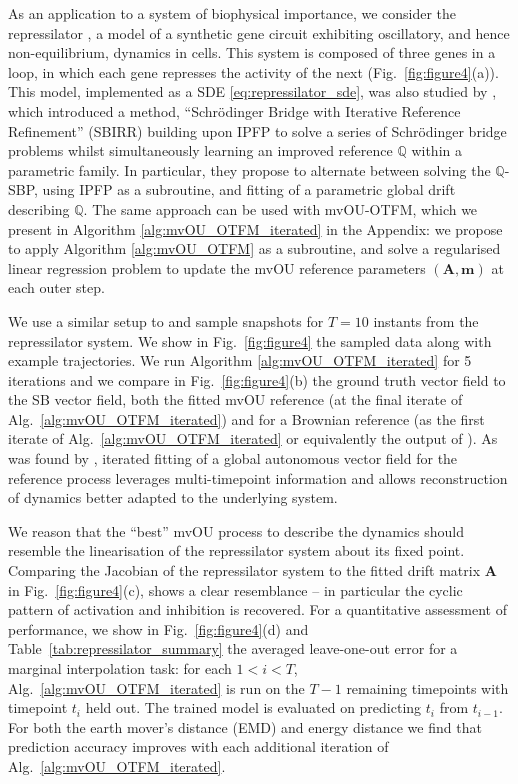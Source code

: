 \documentclass{article}
\theoremstyle{newstyle}
\begin{document}
As an application to a system of biophysical importance, we consider the repressilator \cite{elowitz2000synthetic}, a model of a synthetic gene circuit exhibiting oscillatory, and hence non-equilibrium, dynamics in cells. This system is composed of three genes in a loop, in which each gene represses the activity of the next (Fig.~\ref{fig:figure4}(a)). This model, implemented as a SDE \eqref{eq:repressilator_sde}, was also studied by \cite{shen2024multi}, which introduced a method, ``Schr\"odinger Bridge with Iterative Reference Refinement'' (SBIRR) building upon IPFP \cite{vargas2021solving} to solve a series of Schr\"odinger bridge problems whilst simultaneously learning an improved reference $\mathbb{Q}$ within a parametric family. In particular, they propose to alternate between solving the $\mathbb{Q}$-SBP, using IPFP as a subroutine, and fitting of a parametric global drift describing $\mathbb{Q}$. The same approach can be used with mvOU-OTFM, which we present in Algorithm \ref{alg:mvOU_OTFM_iterated} in the Appendix: we propose to apply Algorithm \ref{alg:mvOU_OTFM} as a subroutine, and solve a regularised linear regression problem to update the mvOU reference parameters $(\bm{A}, \bm{m})$ at each outer step. 

We use a similar setup to \cite{shen2024multi} and sample snapshots for $T = 10$ instants from the repressilator system. We show in Fig.~\ref{fig:figure4} the sampled data along with example trajectories. We run Algorithm \ref{alg:mvOU_OTFM_iterated} for 5 iterations and we compare in Fig.~\ref{fig:figure4}(b) the ground truth vector field to the SB vector field, both the fitted mvOU reference (at the final iterate of Alg.~\ref{alg:mvOU_OTFM_iterated}) and for a Brownian reference (as the first iterate of Alg.~\ref{alg:mvOU_OTFM_iterated} or equivalently the output of \cite{tong2023simulation}). As was found by \cite{shen2024multi, zhang2024joint}, iterated fitting of a global autonomous vector field for the reference process leverages multi-timepoint information and allows reconstruction of dynamics better adapted to the underlying system. 

We reason that the ``best'' mvOU process to describe the dynamics should resemble the linearisation of the repressilator system about its fixed point. Comparing the Jacobian of the repressilator system to the fitted drift matrix $\bm{A}$ in Fig.~\ref{fig:figure4}(c), shows a clear resemblance -- in particular the cyclic pattern of activation and inhibition is recovered.
For a quantitative assessment of performance, we show in Fig.~\ref{fig:figure4}(d) and Table~\ref{tab:repressilator_summary} the averaged leave-one-out error for a marginal interpolation task: for each $1 < i < T$, Alg.~\ref{alg:mvOU_OTFM_iterated} is run on the $T-1$ remaining timepoints with timepoint $t_i$ held out. The trained model is evaluated on predicting $t_i$ from $t_{i-1}$. For both the earth mover's distance (EMD) and energy distance \cite{rizzo2016energy} we find that prediction accuracy improves with each additional iteration of Alg.~\ref{alg:mvOU_OTFM_iterated}.
\end{document}
